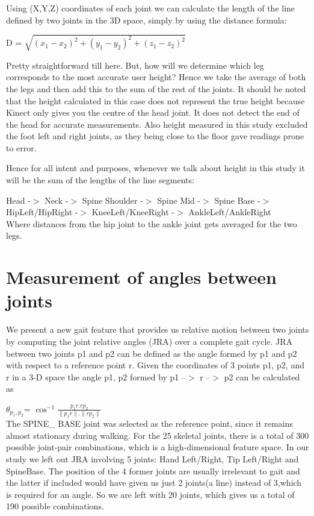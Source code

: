 \noindent Using (X,Y,Z) coordinates of each joint we can calculate the length of the line defined by two joints in the 3D space, simply by using the distance formula:

 D = $\sqrt{(x_{1}-x_{2})^2+ (y_{1}-y_{2})^2+(z_{1}-z_{2})^2}$

\noindent Pretty straightforward till here. But, how will we determine which leg corresponds to the most accurate user height? Hence we take the average of both the legs and then add this to the sum of the rest of the joints.
It should be noted that the height calculated in this case does not represent the true height because Kinect only gives you the centre of the head joint. It does not detect the end of the head for accurate measurements. Also height measured in this study excluded the foot left and right joints, as they being close to the floor gave readings prone to error.

\noindent Hence for all intent and purposes, whenever we talk about height in this study it will be the sum of the lengths of the line segments:

\noindent Head -$>$ Neck -$>$ Spine Shoulder -$>$ Spine Mid -$>$ Spine Base -$>$ HipLeft/HipRight -$>$ KneeLeft/KneeRight -$>$ AnkleLeft/AnkleRight\\ 
Where distances from the hip joint to the ankle joint gets averaged for the two legs.
\newpage
\section{ Measurement of angles between joints} \label{ Measurement of angles between joints}
We present a new gait feature that provides us relative motion between two joints by computing the joint relative angles (JRA) over a complete gait cycle. JRA between two joints p1 and p2 can be defined as the angle formed by p1 and p2 with respect to a reference point r. Given the coordinates of 3 points p1, p2, and r in a 3-D space the angle p1, p2 formed by p1 --$>$ r --$>$ p2 can be calculated as

       \(\theta_{p_1,p_2} \)= \(\cos^{-1} \frac{ {p_{1}r.rp_{2}}}{\|{ p_{1}r }\|.\|{rp_{2}} \|}\)\\

\noindent The SPINE\_ BASE joint was selected as the reference point, since it remains almost stationary during walking. For the 25 skeletal joints, there is a total of 300 possible joint-pair combinations, which is a high-dimensional feature space. In our study we left out JRA involving 5 joints:  Hand Left/Right, Tip Left/Right and SpineBase. The position of the 4 former joints are usually irrelevant to gait and the latter if included would have given us just 2 joints(a line) instead of 3,which is required for an angle. So we are left with 20 joints, which gives us a total of 190 possible combinations.

